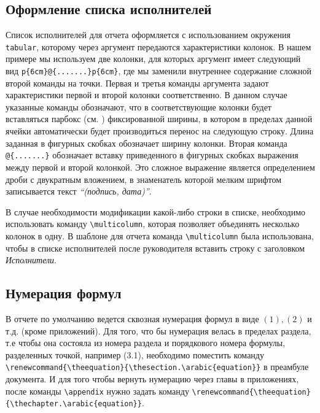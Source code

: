\subsection{Оформление списка исполнителей}

Список исполнителей для отчета оформляется с использованием окружения \verb|tabular|, которому через аргумент передаются характеристики колонок. В нашем примере мы используем две колонки, для которых аргумент имеет следующий вид \verb|p{6cm}@{.......}p{6cm}|, где мы заменили внутреннее содержание сложной второй команды на точки. Первая и третья команды аргумента задают характеристики первой и второй колонки соответственно. В данном случае указанные команды обозначают, что в соответствующие колонки будет вставляться парбокс (см. \cite[глава 9]{Kotelnikov}) фиксированной ширины, в котором в пределах данной ячейки автоматически будет производиться перенос на следующую строку. Длина заданная в фигурных скобках обозначает ширину колонки. Вторая команда \verb|@{.......}| обозначает вставку приведенного в фигурных скобках выражения между первой и второй колонкой. Это сложное выражение является определением дроби с двукратным вложением, в знаменатель которой мелким шрифтом записывается текст {\itshape ``(подпись,
дата)''}.

В случае необходимости модификации какой-либо строки в списке, необходимо использовать команду \verb|\multicolumn|, которая позволяет объединять несколько колонок в одну. В шаблоне для отчета команда \verb|\multicolumn| была использована, чтобы в списке исполнителей после руководителя вставить строку с заголовком {\itshape Исполнители}.

\subsection{Нумерация формул}

В отчете по умолчанию ведется сквозная нумерация формул  в виде $(1), (2)$ и т.д. (кроме приложений). Для того, что бы нумерация велась в пределах раздела, т.е чтобы она состояла  из номера раздела и порядкового номера формулы, разделенных точкой, например (3.1), необходимо поместить команду \verb|\renewcommand{\theequation}{\thesection.\arabic{equation}}| в преамбуле документа. И для того чтобы вернуть нумерацию через главы в приложениях, после команды \verb|\appendix| нужно задать команду \verb|\renewcommand{\theequation}{\thechapter.\arabic{equation}}|.